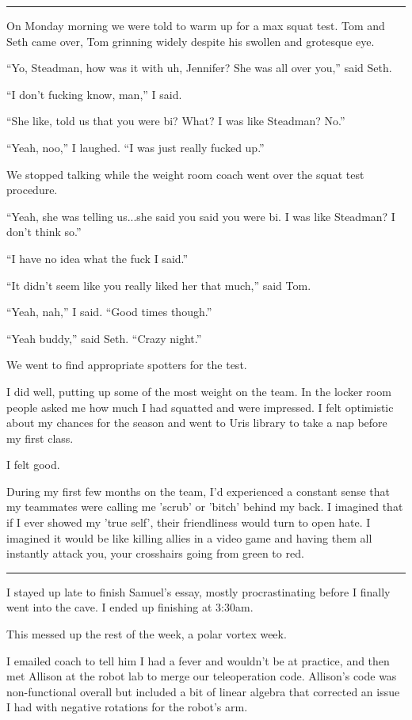\plainfancybreak{12pt}{2}{* * *}

On Monday morning we were told to warm up for a max squat test.  Tom and Seth
came over, Tom grinning widely despite his swollen and grotesque eye.

``Yo, Steadman, how was it with uh, Jennifer?  She was all over you,'' said
Seth.

``I don't fucking know, man,'' I said.

``She like, told us that you were bi?  What?  I was like Steadman?  No.''

``Yeah, noo,'' I laughed. ``I was just really fucked up.''

We stopped talking while the weight room coach went over the squat test
procedure. 

``Yeah, she was telling us...she said you said you were bi.  I was like
Steadman?  I don't think so.''

``I have no idea what the fuck I said.''

``It didn't seem like you really liked her that much,'' said Tom.

``Yeah, nah,'' I said.  ``Good times though.''

``Yeah buddy,'' said Seth.  ``Crazy night.'' 

We went to find appropriate spotters for the test.

I did well, putting up some of the most weight on the team.  In the locker room
people asked me how much I had squatted and were impressed.  I felt optimistic
about my chances for the season and went to Uris library to take a nap before my
first class.

I felt good.

During my first few months on the team, I'd experienced a constant sense that my
teammates were calling me 'scrub' or 'bitch' behind my back.  I imagined that if I ever showed my 'true self', their friendliness would turn to open hate.  I
imagined it would be like killing allies in a video game and having them all
instantly attack you, your crosshairs going from green to red. 

\plainfancybreak{12pt}{2}{* * *}

I stayed up late to finish Samuel's essay, mostly procrastinating before I
finally went into the cave.  I ended up finishing at 3:30am.

This messed up the rest of the week, a polar vortex week.

I emailed coach to tell him I had a fever and wouldn't be at practice, and then
met Allison at the robot lab to merge our teleoperation code.   Allison's code
was non-functional overall but included a bit of linear algebra that corrected
an issue I had with negative rotations for the robot's arm.

